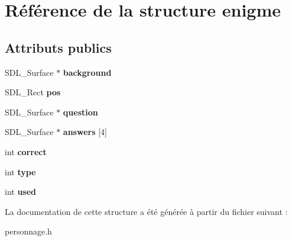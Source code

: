 \hypertarget{structenigme}{}\section{Référence de la structure enigme}
\label{structenigme}
\subsection*{Attributs publics}
\begin{DoxyCompactItemize}
\item 
\mbox{\label{structenigme_afef580eaca259227dac7bbae2d09f8f7}} 
S\+D\+L\+\_\+\+Surface $\ast$ {\bfseries background}
\item 
\mbox{\label{structenigme_a119fab0134af6a040be34f88cc755be6}} 
S\+D\+L\+\_\+\+Rect {\bfseries pos}
\item 
\mbox{\label{structenigme_adec802c78900b973edc50e1f1123fdf5}} 
S\+D\+L\+\_\+\+Surface $\ast$ {\bfseries question}
\item 
\mbox{\label{structenigme_a260a5ae27cfa4f573a1961f78f5a6fd6}} 
S\+D\+L\+\_\+\+Surface $\ast$ {\bfseries answers} \mbox{[}4\mbox{]}
\item 
\mbox{\label{structenigme_ad68391010efb66b05bbb9f930e324a3e}} 
int {\bfseries correct}
\item 
\mbox{\label{structenigme_a2dfaa436eec08235e9d171809c885625}} 
int {\bfseries type}
\item 
\mbox{\label{structenigme_a75a82b3a51c8895f9152d7fd0ade1d1c}} 
int {\bfseries used}
\end{DoxyCompactItemize}


La documentation de cette structure a été générée à partir du fichier suivant \+:\begin{DoxyCompactItemize}
\item 
personnage.\+h\end{DoxyCompactItemize}
